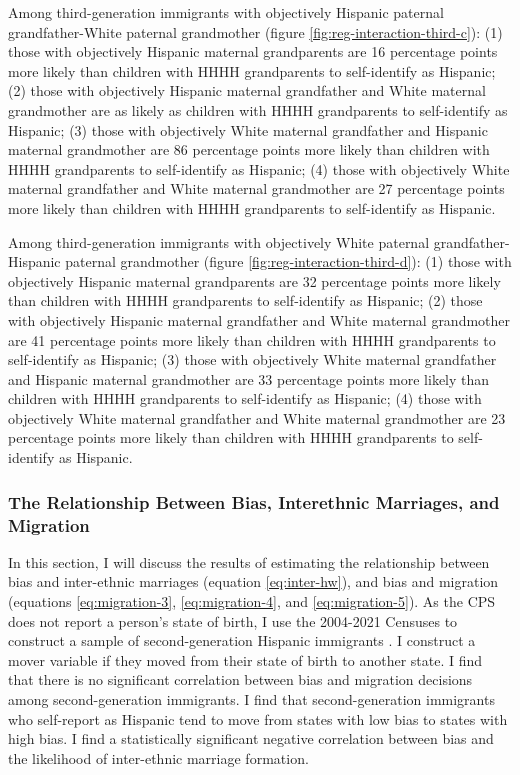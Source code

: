 \documentclass[12pt, fullpage]{article}
\begin{document}
Among third-generation immigrants with objectively Hispanic paternal grandfather-White paternal grandmother (figure \ref{fig:reg-interaction-third-c}): (1) those with objectively Hispanic maternal grandparents are 16 percentage points more likely than children with HHHH grandparents to self-identify as Hispanic; (2) those with objectively Hispanic maternal grandfather and White maternal grandmother are as likely as children with HHHH grandparents to self-identify as Hispanic; (3) those with objectively White maternal grandfather and Hispanic maternal grandmother are 86 percentage points more likely than children with HHHH grandparents to self-identify as Hispanic; (4) those with objectively White maternal grandfather and White maternal grandmother are 27 percentage points more likely than children with HHHH grandparents to self-identify as Hispanic. 

Among third-generation immigrants with objectively White paternal grandfather-Hispanic paternal grandmother (figure \ref{fig:reg-interaction-third-d}): (1) those with objectively Hispanic maternal grandparents are 32 percentage points more likely than children with HHHH grandparents to self-identify as Hispanic; (2) those with objectively Hispanic maternal grandfather and White maternal grandmother are 41 percentage points more likely than children with HHHH grandparents to self-identify as Hispanic; (3) those with objectively White maternal grandfather and Hispanic maternal grandmother are 33 percentage points more likely than children with HHHH grandparents to self-identify as Hispanic; (4) those with objectively White maternal grandfather and White maternal grandmother are 23 percentage points more likely than children with HHHH grandparents to self-identify as Hispanic. 


\subsubsection{The Relationship Between Bias, Interethnic Marriages, and Migration}\label{sub:inter_eth_mar}

In this section, I will discuss the results of estimating the relationship between bias and inter-ethnic marriages (equation \ref{eq:inter-hw}), and bias and migration (equations \ref{eq:migration-3}, \ref{eq:migration-4}, and \ref{eq:migration-5}). As the CPS does not report a person's state of birth, I use the 2004-2021 Censuses to construct a sample of second-generation Hispanic immigrants \citep{floodsarahIntegratedPublicUse2021}. I construct a mover variable if they moved from their state of birth to another state. I find that there is no significant correlation between bias and migration decisions among second-generation immigrants. I find that second-generation immigrants who self-report as Hispanic tend to move from states with low bias to states with high bias. I find a statistically significant negative correlation between bias and the likelihood of inter-ethnic marriage formation.
\end{document}
